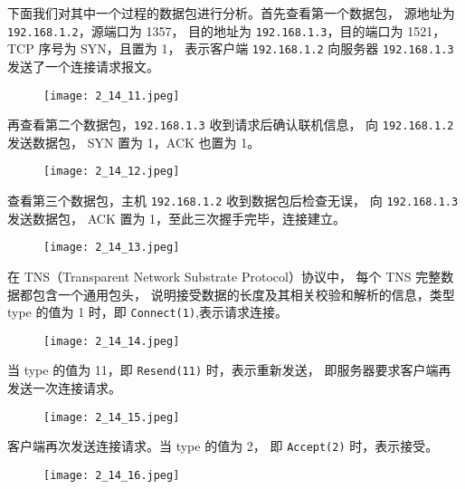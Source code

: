 下面我们对其中一个过程的数据包进行分析。首先查看第一个数据包，
源地址为 \texttt{192.168.1.2}，源端口为 1357，
目的地址为 \texttt{192.168.1.3}，目的端口为 1521，
TCP 序号为 SYN，且置为 1，
表示客户端 \texttt{192.168.1.2} 向服务器 \texttt{192.168.1.3} 发送了一个连接请求报文。
\begin{figure}[H]
  \begin{center}
    \texttt{[image: 2\_14\_11.jpeg]}
  \end{center}
\end{figure}

再查看第二个数据包，\texttt{192.168.1.3} 收到请求后确认联机信息，
向 \texttt{192.168.1.2} 发送数据包，
SYN 置为 1，ACK 也置为 1。
\begin{figure}[H]
  \begin{center}
    \texttt{[image: 2\_14\_12.jpeg]}
  \end{center}
\end{figure}

查看第三个数据包，主机 \texttt{192.168.1.2} 收到数据包后检查无误，
向 \texttt{192.168.1.3} 发送数据包，
ACK 置为 1，至此三次握手完毕，连接建立。
\begin{figure}[H]
  \begin{center}
    \texttt{[image: 2\_14\_13.jpeg]}
  \end{center}
\end{figure}

在 TNS（Transparent Network Substrate Protocol）协议中，
每个 TNS 完整数据都包含一个通用包头，
说明接受数据的长度及其相关校验和解析的信息，类型 type 的值为 1 时，即
\texttt{Connect(1)},表示请求连接。
\begin{figure}[H]
  \begin{center}
    \texttt{[image: 2\_14\_14.jpeg]}
  \end{center}
\end{figure}

当 type 的值为 11，即 \texttt{Resend(11)} 时，表示重新发送，
即服务器要求客户端再发送一次连接请求。
\begin{figure}[H]
  \begin{center}
    \texttt{[image: 2\_14\_15.jpeg]}
  \end{center}
\end{figure}

客户端再次发送连接请求。当 type 的值为 2，
即 \texttt{Accept(2)} 时，表示接受。
\begin{figure}[H]
  \begin{center}
    \texttt{[image: 2\_14\_16.jpeg]}
  \end{center}
\end{figure}

